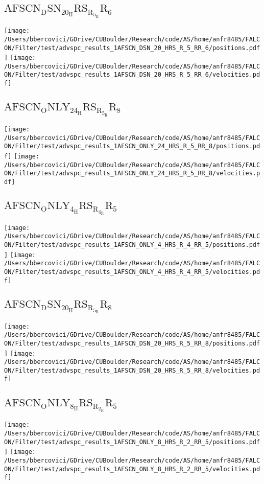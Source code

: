 \subsection{$\mathrm{AFSCN_DSN_20_HRS_R_5_RR_6}$}
\texttt{[image: /Users/bbercovici/GDrive/CUBoulder/Research/code/AS/home/anfr8485/FALCON/Filter/test/advspc\_results\_1AFSCN\_DSN\_20\_HRS\_R\_5\_RR\_6/positions.pdf]}
\texttt{[image: /Users/bbercovici/GDrive/CUBoulder/Research/code/AS/home/anfr8485/FALCON/Filter/test/advspc\_results\_1AFSCN\_DSN\_20\_HRS\_R\_5\_RR\_6/velocities.pdf]}
\subsection{$\mathrm{AFSCN_ONLY_24_HRS_R_5_RR_8}$}
\texttt{[image: /Users/bbercovici/GDrive/CUBoulder/Research/code/AS/home/anfr8485/FALCON/Filter/test/advspc\_results\_1AFSCN\_ONLY\_24\_HRS\_R\_5\_RR\_8/positions.pdf]}
\texttt{[image: /Users/bbercovici/GDrive/CUBoulder/Research/code/AS/home/anfr8485/FALCON/Filter/test/advspc\_results\_1AFSCN\_ONLY\_24\_HRS\_R\_5\_RR\_8/velocities.pdf]}
\subsection{$\mathrm{AFSCN_ONLY_4_HRS_R_4_RR_5}$}
\texttt{[image: /Users/bbercovici/GDrive/CUBoulder/Research/code/AS/home/anfr8485/FALCON/Filter/test/advspc\_results\_1AFSCN\_ONLY\_4\_HRS\_R\_4\_RR\_5/positions.pdf]}
\texttt{[image: /Users/bbercovici/GDrive/CUBoulder/Research/code/AS/home/anfr8485/FALCON/Filter/test/advspc\_results\_1AFSCN\_ONLY\_4\_HRS\_R\_4\_RR\_5/velocities.pdf]}
\subsection{$\mathrm{AFSCN_DSN_20_HRS_R_5_RR_8}$}
\texttt{[image: /Users/bbercovici/GDrive/CUBoulder/Research/code/AS/home/anfr8485/FALCON/Filter/test/advspc\_results\_1AFSCN\_DSN\_20\_HRS\_R\_5\_RR\_8/positions.pdf]}
\texttt{[image: /Users/bbercovici/GDrive/CUBoulder/Research/code/AS/home/anfr8485/FALCON/Filter/test/advspc\_results\_1AFSCN\_DSN\_20\_HRS\_R\_5\_RR\_8/velocities.pdf]}
\subsection{$\mathrm{AFSCN_ONLY_8_HRS_R_2_RR_5}$}
\texttt{[image: /Users/bbercovici/GDrive/CUBoulder/Research/code/AS/home/anfr8485/FALCON/Filter/test/advspc\_results\_1AFSCN\_ONLY\_8\_HRS\_R\_2\_RR\_5/positions.pdf]}
\texttt{[image: /Users/bbercovici/GDrive/CUBoulder/Research/code/AS/home/anfr8485/FALCON/Filter/test/advspc\_results\_1AFSCN\_ONLY\_8\_HRS\_R\_2\_RR\_5/velocities.pdf]}
